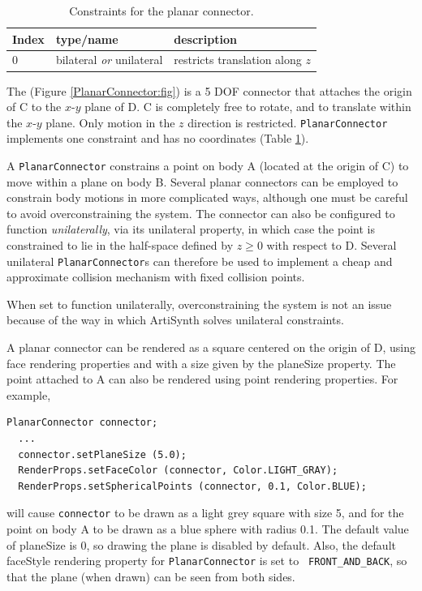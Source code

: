 \begin{table}[h]
\centering
\begin{tabular}{|l|l|l|}
\hline
Index & type/name & description \\
\hline
0 & bilateral {\it or} unilateral & restricts translation along $z$ \\
\hline
\end{tabular}
\caption{Constraints for the planar connector.}
\label{PlanarConnectorConstraints:tbl}
\end{table}

The 
(Figure \ref{PlanarConnector:fig}) is a 5 DOF connector that attaches
the origin of C to the $x$-$y$ plane of D. C is completely free to
rotate, and to translate within the $x$-$y$ plane. Only motion in the
$z$ direction is restricted. {\tt PlanarConnector} implements one
constraint and has no coordinates
(Table \ref{PlanarConnectorConstraints:tbl}).

A {\tt PlanarConnector} constrains a point on body A (located at the
origin of C) to move within a plane on body B. Several planar
connectors can be employed to constrain body motions in more
complicated ways, although one must be careful to avoid
overconstraining the system. The connector can also be configured to
function {\it unilaterally}, via its {\sf unilateral} property, in
which case the point is constrained to lie in the half-space defined by
$z \ge 0$ with respect to D. Several unilateral {\tt PlanarConnector}s
can therefore be used to implement a cheap and approximate collision
mechanism with fixed collision points.

\begin{sideblock}
When set to function unilaterally, overconstraining the system is not
an issue because of the way in which ArtiSynth solves unilateral
constraints.
\end{sideblock}

A planar connector can be rendered as a square centered on the origin
of D, using face rendering properties and with a size given by the
{\sf planeSize} property. The point attached to A can also be rendered
using point rendering properties. For example,
%
\begin{lstlisting}[]
  PlanarConnector connector;
  ...
  connector.setPlaneSize (5.0);
  RenderProps.setFaceColor (connector, Color.LIGHT_GRAY);
  RenderProps.setSphericalPoints (connector, 0.1, Color.BLUE);
\end{lstlisting}
%
will cause {\tt connector} to be drawn as a light grey square with
size 5, and for the point on body A to be drawn as a blue sphere with
radius 0.1. The default value of {\sf planeSize} is 0, so drawing the
plane is disabled by default. Also, the default {\sf faceStyle}
rendering property for {\tt PlanarConnector} is set to {\tt
FRONT\_AND\_BACK}, so that the plane (when drawn) can be seen from
both sides.

